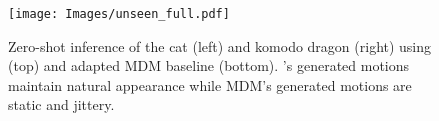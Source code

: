 \begin{figure}
    

    \centering
    
    \texttt{[image: Images/unseen\_full.pdf]}
    
    \caption{
        \textbf{\Unseengen} 
        Zero-shot inference of the cat (left) and komodo dragon (right) using \algoname (top) and adapted MDM baseline (bottom). \algoname's generated motions maintain natural appearance while MDM's generated motions are static and jittery. 
        }
    \label{fig:unseen}
    \Description[]{}  %
\end{figure}
